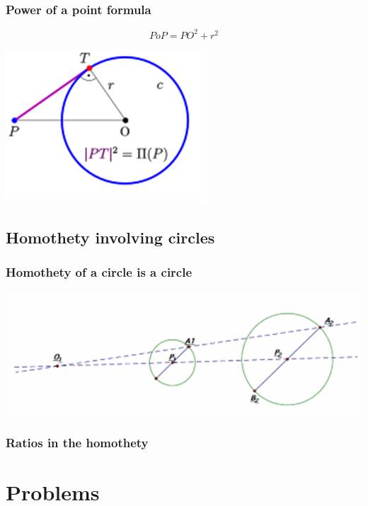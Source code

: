 \documentclass{article}
\begin{document}
\pagebreak

\subsubsection{Power of a point formula}

\[PoP = {PO}^2+r^2\]

\begin{center}
\includegraphics{Picture14.png}
\end{center}

\vspace{60px}

\subsection{Homothety involving circles}

\subsubsection{Homothety of a circle is a circle}

\includegraphics{Picture15.png}

\subsubsection{Ratios in the homothety}

\pagebreak

\section{Problems}
\end{document}
